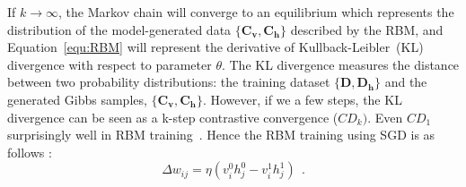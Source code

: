 If $ k \to \infty $, the Markov chain will converge to an equilibrium which represents the distribution of the model-generated data $\{\mathbf{C_v}, \mathbf{C_h}\}$ described by the RBM, and Equation~\ref{equ:RBM} will represent the derivative of \DIFaddbegin {}\DIFaddend Kullback-Leibler~(KL) divergence with respect to parameter $\theta$.
The KL divergence measures the distance between two probability distributions: the training dataset $\{\mathbf{D}, \mathbf{D_h}\}$ and the generated Gibbs samples, $\{\mathbf{C_v}, \mathbf{C_h}\}$.
However, if we \DIFdelbegin {}\DIFdelend \DIFaddbegin {}\DIFaddend a few steps, the KL divergence can be seen as a k-step contrastive convergence ($ CD_{k}) $.
Even $ CD_1 $ \DIFdelbegin {}\DIFdelend \DIFaddbegin {}\DIFaddend surprisingly well in RBM training~\DIFdelbegin {}\DIFdelend \DIFaddbegin {}\DIFaddend .
Hence the RBM training using SGD is as follows :
\begin{equation}
\Delta w_{ij} = \eta (v^0_i h^0_j-v^1_i h^1_j)~~.
\label{equ:rbm_train}
\end{equation}



